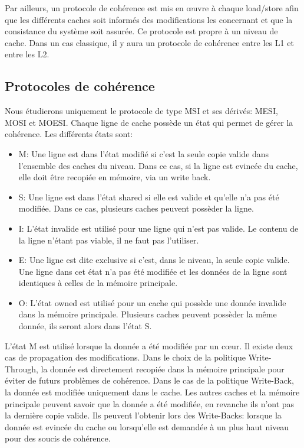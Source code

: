 \documentclass[a4paper]{article}
\begin{document}
\indent Par ailleurs, un protocole de cohérence est mis en {\oe}uvre à chaque load/store afin que les différents caches soit informés des modifications les concernant et que la consistance du système soit assurée. Ce protocole est propre à un niveau de cache. Dans un cas classique, il y aura un protocole de cohérence entre les L1 et entre les L2.

\subsection{Protocoles de cohérence}
\indent Nous étudierons uniquement le protocole de type MSI et ses dérivés: MESI, MOSI et MOESI. Chaque ligne de cache possède un état qui permet de gérer la cohérence. Les différents états sont: \\
\begin{itemize}
\item M: Une ligne est dans l'état modifié si c'est la seule copie valide dans l'ensemble des caches du niveau. Dans ce cas, si la ligne est evincée du cache, elle doit être recopiée en mémoire, via un write back. \\
\item S: Une ligne est dans l'état shared si elle est valide et qu'elle n'a pas été modifiée. Dans ce cas, plusieurs caches peuvent possèder la ligne. \\
\item I: L'état invalide est utilisé pour une ligne qui n'est pas valide. Le contenu de la ligne n'étant pas viable, il ne faut pas l'utiliser. \\
\item E: Une ligne est dite exclusive si c'est, dans le niveau, la seule copie valide. Une ligne dans cet état n'a pas été modifiée et les données de la ligne sont identiques à celles de la mémoire principale. \\
\item O: L'état owned est utilisé pour un cache qui possède une donnée invalide dans la mémoire principale. Plusieurs caches peuvent possèder la même donnée, ils seront alors dans l'état S. \\
\end{itemize}

\indent L'état M est utilisé lorsque la donnée a été modifiée par un c{\oe}ur. Il existe deux cas de propagation des modifications. Dans le choix de la politique Write-Through, la donnée est directement recopiée dans la mémoire principale pour éviter de futurs problèmes de cohérence. Dans le cas de la politique Write-Back, la donnée est modifiée uniquement dans le cache. Les autres caches et la mémoire principale peuvent savoir que la donnée a été modifiée, en revanche ils n'ont pas la dernière copie valide. Ils peuvent l'obtenir lors des Write-Backs: lorsque la donnée est evincée du cache ou lorsqu'elle est demandée à un plus haut niveau pour des soucis de cohérence.
\end{document}
